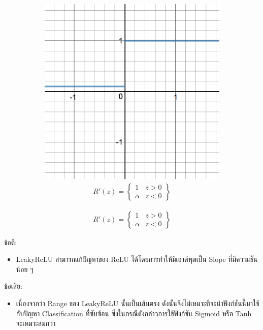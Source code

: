 \begin{itemize}
\begin{figure}[H]
\begin{subfigure}{0.5\textwidth}
{\begin{equation}
                \end{equation}
            }
            \label{fig:actfunc_leakyrelu}
        \end{subfigure}%
        \begin{subfigure}{0.5\textwidth}
            \centering
            \includegraphics[width=0.9\linewidth]{fig/actfunc_leakyrelu_der.png}
            \caption{%
                \begin{equation}
                    \begin{split}R'(z) = \begin{Bmatrix} 1 & z>0 \\
                        \alpha & z<0 \end{Bmatrix}\end{split}
                \end{equation}
            }
            \label{fig:actfunc_leakyrelu_der}
        \end{subfigure}
    \end{figure}
    ข้อดี:
    \begin{itemize}
        \item LeakyReLU สามารถแก้ปัญหาของ ReLU ได้โดยการทำให้มีเอาต์พุตเป็น Slope ที่มีความชันน้อย ๆ
    \end{itemize}
    ข้อเสีย:
    \begin{itemize}
        \item เนื่องจากว่า Range ของ LeakyReLU นั้นเป็นเส้นตรง ดังนั้นจึงไม่เหมาะที่จะนำฟังก์ชันนี้มาใช้กับปัญหา Classification ที่ซับซ้อน
        ซึ่งในกรณีดังกล่าวการใช้ฟังก์ชัน Sigmoid หรือ Tanh จะเหมาะสมกว่า
    \end{itemize}


\end{itemize}

